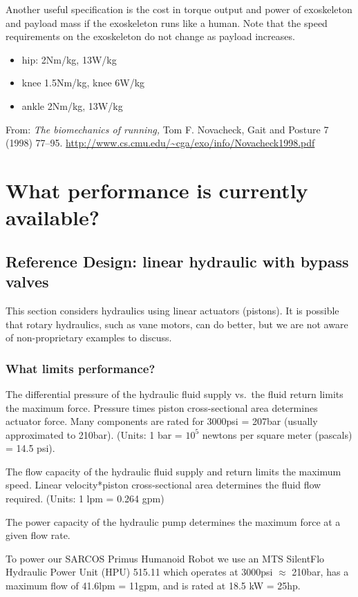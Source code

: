 \documentclass[letterpaper,12pt,fullpage]{article}
\begin{document}
Another useful specification is the cost in torque output and power
of exoskeleton and payload mass if the exoskeleton runs like a human.
Note that the speed requirements on the exoskeleton do not change as
payload increases.
\begin{itemize}
\item
hip: 2Nm/kg, 13W/kg
\item
knee 1.5Nm/kg, knee 6W/kg
\item
ankle 2Nm/kg, 13W/kg
\end{itemize}
From: {\it The biomechanics of running,} Tom F. Novacheck,
Gait and Posture 7 (1998) 77–95.
\url{http://www.cs.cmu.edu/~cga/exo/info/Novacheck1998.pdf}

\section{What performance is currently available?}

\subsection{Reference Design: linear hydraulic with bypass valves}

This section considers hydraulics using linear actuators (pistons).
It is possible that rotary hydraulics, such as vane motors,
can do better, but we are not aware of non-proprietary examples
to discuss.

\subsubsection{What limits performance?}

The differential pressure of the hydraulic fluid supply vs.\ the fluid
return limits the maximum force. Pressure times piston cross-sectional area
determines actuator force.
Many components are rated for 3000psi = 207bar (usually approximated to
210bar).
(Units: 1 bar = $10^5$ newtons per square meter (pascals) = 14.5 psi).

The flow capacity of the hydraulic fluid supply and return limits
the maximum speed. Linear velocity*piston cross-sectional area determines 
the fluid flow required.
(Units: 1 lpm = 0.264 gpm)

The power capacity of the hydraulic pump determines the maximum force
at a given flow rate.

To power our SARCOS Primus Humanoid Robot we use an
MTS SilentFlo Hydraulic Power Unit (HPU) 515.11
which operates at 3000psi $\approx$ 210bar,
has a maximum flow of 41.6lpm = 11gpm, and is rated at
18.5 kW = 25hp.
\end{document}
